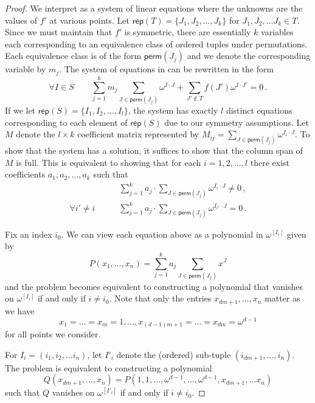 \documentclass{toc}
\newcommand\perm{\textsf{perm}}
\newcommand\rep{\textsf{rep}}
\begin{document}
\begin{proof}

We interpret  as a system of linear equations where the unknowns are the values of $f'$ at various points.  Let $\rep(T) = \{J_1, J_2, \dots , J_k \}$ for $J_1, J_2, \dots J_k \in T$.  Since we must maintain that $f'$ is symmetric, there are essentially $k$ variables each corresponding to an equivalence class of ordered tuples under permutations.  Each equivalence class is of the form $\perm(J_j)$ and we denote the corresponding variable by $m_j$.  The system of equations in  can be rewritten in the form
\[    %
%
\forall I \in S\qquad 
\sum_{j=1}^k m_j \sum_{J \in \perm(J_j)} \omega^{I \cdot J} + \sum_{J' \notin T}f(J') \omega^{I \cdot J'} = 0 \,.
\]
If we let  $\rep(S) = \{ I_1, I_2, \dots , I_l\}$, the system has exactly $l$ distinct equations corresponding to each element of $\rep(S)$ due to our symmetry assumptions.  Let $M$ denote the $l \times k$ coefficient matrix represented by $M_{ij} = \sum_{J \in \perm(J_j)} \omega^{I_i \cdot J}$.  To show that the system has a solution, it suffices to show that the column span of $M$ is full.  This is equivalent to showing that for each $i = 1,2, \dots, l$ there exist coefficients $a_1,a_2, \dots ,a_k$ such that
%
\begin{align*}
& \sum_{j=1}^{k} a_j \cdot\sum_{J \in \perm(J_j)} \omega^{I_i \cdot J}  \neq 0\,,  \\
\forall i' \neq i \qquad
& \sum_{j=1}^{k} a_j \cdot\sum_{J \in \perm(J_j)} \omega^{I_{i'} \cdot J} =0  \,.
\end{align*}
%
%
%

Fix an index $i_0$.  We can view each equation above as a polynomial in $\omega^{[I_{i}]}$ given by 
\[
P(x_1, \dots ,x_n) = \sum_{j=1}^k a_j \sum_{J \in \perm(J_j)} x^J
\]
and the problem becomes equivalent to constructing a polynomial that vanishes on $\omega^{[I_{i}]}$ if and only if $i \neq i_0$.  Note that only the entries $x_{dm+1}, \dots , x_n$ matter as we have \[x_1 = \dots = x_m = 1, \dots , x_{(d-1)m+1} = \dots = x_{dm} = \omega^{d-1}\] for all points we consider.

For $I_i = (i_1, i_2, \dots i_n)$, let $I'_i$ denote the (ordered) sub-tuple $(i_{dm+1}, \dots , i_n)$.  The problem is equivalent to constructing a polynomial  
\[
Q(x_{dm+1}, \dots ,x_n) = P(1,1, \dots, \omega^{d-1}, \dots, \omega^{d-1}, x_{dm+1}, \dots x_n)
\]
such that $Q$ vanishes on $\omega^{[I'_{i}]}$ if and only if $i \neq i_0$.



\end{proof}
\end{document}
